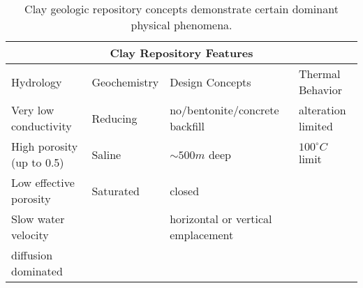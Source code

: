 %
\begin{table}[h!]
  \centering
  \footnotesize{
  \begin{tabularx}{\textwidth}{|X|X|X|X|}
    \multicolumn{4}{c}{\textbf{Clay Repository Features}}\\
    \hline
     Hydrology & Geochemistry & Design Concepts & Thermal Behavior \\ 
    \hline
    Very low conductivity&Reducing&no/bentonite/concrete backfill &alteration limited\\
    High porosity (up to 0.5)&Saline&$\sim500m$ deep&$100^\circ C$ limit \\
    Low effective porosity&Saturated&closed&\\
    Slow water velocity &&horizontal or vertical emplacement&\\
    diffusion dominated &&&\\
    \hline
  \end{tabularx}
  \caption[Clay repository features.]{Clay geologic repository 
  concepts demonstrate certain dominant physical phenomena. }
  \label{tab:clay_tab}
  }
\end{table}


